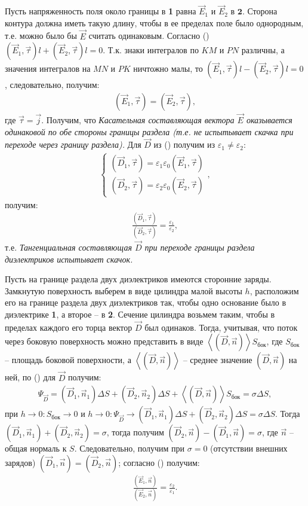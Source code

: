 \documentclass[__main__.tex]{subfiles}
\begin{document}
Пусть напряженность поля около границы в \textbf{1} равна $\vec{E}_1$ и $\vec{E}_2$ в $\textbf{2}$. Сторона контура должна иметь такую длину, чтобы в ее пределах поле было однородным, т.е. можно было бы $\vec{E}$ считать одинаковым. Согласно () $(\vec{E}_1,\vec{\tau})l + (\vec{E}_2,\vec{\tau})l = 0$. Т.к. знаки интегралов по $KM$ и $PN$ различны, а значения интегралов на $MN$ и $PK$ ничтожно малы, то $(\vec{E}_1,\vec{\tau})l-(\vec{E}_2,\vec{\tau})l=0$, следовательно, получим:
\begin{gather}
(\vec{E}_1,\vec{\tau}) = (\vec{E}_2,\vec{\tau}),
\end{gather}
где $\vec{\tau} = \vec{j}$. Получим, что \emph{Касательная составляющая вектора $\vec{E}$ оказывается одинаковой по обе стороны границы раздела (т.е. не испытывает скачка при переходе через границу раздела).} Для $\vec{D}$ из () получим из $\varepsilon_1\neq\varepsilon_2$:
\begin{gather}
\begin{cases}
(\vec{D}_1,\vec{\tau}) = \varepsilon_1\varepsilon_0(\vec{E}_1,\vec{\tau}) \\
(\vec{D}_2,\vec{\tau}) = \varepsilon_2\varepsilon_0(\vec{E}_2,\vec{\tau})
\end{cases},
\end{gather}
получим:
\begin{gather}
\frac{(\vec{D}_1,\vec{\tau})}{(\vec{D}_2,\vec{\tau})} = \frac{\varepsilon_1}{\varepsilon_2},
\end{gather}
т.е. \emph{Тангенциальная составляющая $\vec{D}$ при переходе границы раздела диэлектриков испытывает скачок.}

Пусть на границе раздела двух диэлектриков имеются сторонние заряды. Замкнутую поверхность выберем в виде цилиндра малой высоты $h$, расположим его на границе раздела двух диэлектриков так, чтобы одно основание было в диэлектрике \textbf{1}, а второе – в \textbf{2}. Сечение цилиндра возьмем таким, чтобы в пределах каждого его торца вектор $\vec{D}$ был одинаков. Тогда, учитывая, что поток через боковую поверхность можно представить в виде $\left<(\vec{D},\vec{n})\right>S_{\text{бок}}$, где $S_{\text{бок}}$ -- площадь боковой поверхности, а $\left<(\vec{D},\vec{n})\right>$ -- среднее значение $(\vec{D},\vec{n})$ на ней, по () для $\vec{D}$ получим:
\begin{gather}
\Psi_{\vec{D}} = (\vec{D}_1,\vec{n}_1)\Delta S + (\vec{D}_2,\vec{n}_2)\Delta S + \left<(\vec{D},\vec{n})\right>S_{\text{бок}} = \sigma\Delta S,
\end{gather}
при $h\rightarrow 0\colon S_{\text{бок}}\rightarrow 0$ и $h\rightarrow 0\colon\Psi_{\vec{D}}\rightarrow (\vec{D}_1,\vec{n}_1)\Delta S + (\vec{D}_2,\vec{n}_2)\Delta S = \sigma\Delta S$. Тогда $(\vec{D}_1,\vec{n}_1)+(\vec{D}_2,\vec{n}_2)=\sigma$, тогда получим $(\vec{D}_2,\vec{n})-(\vec{D}_1,\vec{n})=\sigma$, где $\vec{n}$ -- общая нормаль к $S$. Следовательно, получим при $\sigma=0$ (отсутствии внешних зарядов) $(\vec{D}_1,\vec{n})=(\vec{D}_2,\vec{n})$; согласно () получим:
\begin{gather}
\frac{(\vec{E}_1,\vec{n})}{(\vec{E}_2,\vec{n})}=\frac{\varepsilon_2}{\varepsilon_1}.
\end{gather}
\end{document}
